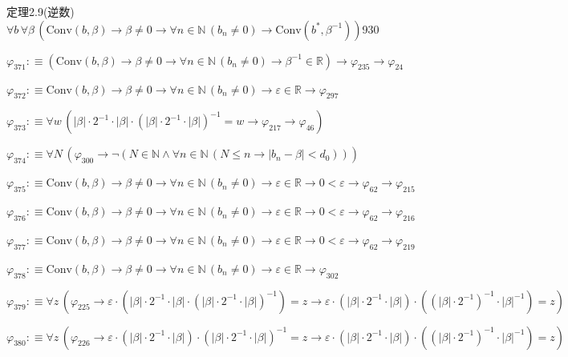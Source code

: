 \begin{fullproof}{定理2.9(逆数)}{$\forall b\,\forall \beta\,(\mathrm{Conv}(b,\beta) \to \beta \neq 0 \to \forall n \in \mathbb{N}\,(b_{n} \neq 0) \to \mathrm{Conv}(b^{\ast},\beta^{-1}))$}{930}
\begin{abbrevlist}
\item $\varphi_{371} :\equiv (\mathrm{Conv}(b,\beta) \to \beta \neq 0 \to \forall n \in \mathbb{N}\,(b_{n} \neq 0) \to \beta^{-1} \in \mathbb{R}) \to \varphi_{235} \to \varphi_{24}$
\item $\varphi_{372} :\equiv \mathrm{Conv}(b,\beta) \to \beta \neq 0 \to \forall n \in \mathbb{N}\,(b_{n} \neq 0) \to \varepsilon \in \mathbb{R} \to \varphi_{297}$
\item $\varphi_{373} :\equiv \forall w\,(\lvert \beta \rvert \cdot 2^{-1} \cdot \lvert \beta \rvert \cdot (\lvert \beta \rvert \cdot 2^{-1} \cdot \lvert \beta \rvert)^{-1} = w \to \varphi_{217} \to \varphi_{46})$
\item $\varphi_{374} :\equiv \forall N\,(\varphi_{300} \to \neg (N \in \mathbb{N} \land \forall n \in \mathbb{N}\,(N \leq n \to \lvert b_{n} - \beta \rvert < d_{0})))$
\item $\varphi_{375} :\equiv \mathrm{Conv}(b,\beta) \to \beta \neq 0 \to \forall n \in \mathbb{N}\,(b_{n} \neq 0) \to \varepsilon \in \mathbb{R} \to 0 < \varepsilon \to \varphi_{62} \to \varphi_{215}$
\item $\varphi_{376} :\equiv \mathrm{Conv}(b,\beta) \to \beta \neq 0 \to \forall n \in \mathbb{N}\,(b_{n} \neq 0) \to \varepsilon \in \mathbb{R} \to 0 < \varepsilon \to \varphi_{62} \to \varphi_{216}$
\item $\varphi_{377} :\equiv \mathrm{Conv}(b,\beta) \to \beta \neq 0 \to \forall n \in \mathbb{N}\,(b_{n} \neq 0) \to \varepsilon \in \mathbb{R} \to 0 < \varepsilon \to \varphi_{62} \to \varphi_{219}$
\item $\varphi_{378} :\equiv \mathrm{Conv}(b,\beta) \to \beta \neq 0 \to \forall n \in \mathbb{N}\,(b_{n} \neq 0) \to \varepsilon \in \mathbb{R} \to \varphi_{302}$
\item $\varphi_{379} :\equiv \forall z\,(\varphi_{225} \to \varepsilon \cdot (\lvert \beta \rvert \cdot 2^{-1} \cdot \lvert \beta \rvert \cdot (\lvert \beta \rvert \cdot 2^{-1} \cdot \lvert \beta \rvert)^{-1}) = z \to \varepsilon \cdot (\lvert \beta \rvert \cdot 2^{-1} \cdot \lvert \beta \rvert) \cdot ((\lvert \beta \rvert \cdot 2^{-1})^{-1} \cdot \lvert \beta \rvert^{-1}) = z)$
\item $\varphi_{380} :\equiv \forall z\,(\varphi_{226} \to \varepsilon \cdot (\lvert \beta \rvert \cdot 2^{-1} \cdot \lvert \beta \rvert) \cdot (\lvert \beta \rvert \cdot 2^{-1} \cdot \lvert \beta \rvert)^{-1} = z \to \varepsilon \cdot (\lvert \beta \rvert \cdot 2^{-1} \cdot \lvert \beta \rvert) \cdot ((\lvert \beta \rvert \cdot 2^{-1})^{-1} \cdot \lvert \beta \rvert^{-1}) = z)$

\end{abbrevlist}
\end{fullproof}
